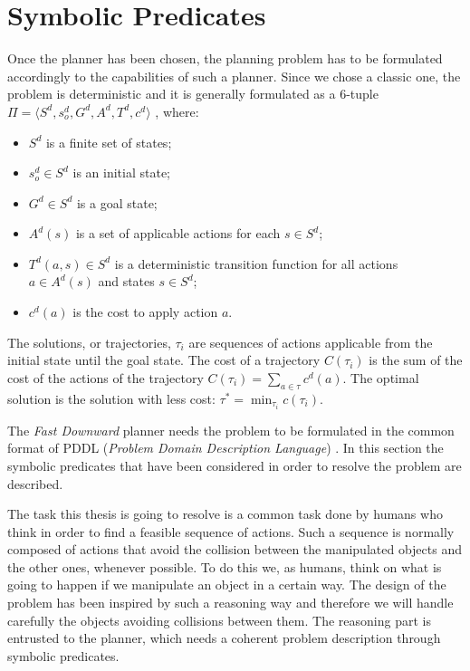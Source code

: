 \section{Symbolic Predicates}
Once the planner has been chosen, the planning problem has to be formulated accordingly to the capabilities of such a planner. Since we chose a classic one, the problem is deterministic and it is generally formulated as a $6$-tuple $\Pi=\langle S^d, s_o^d, G^d, A^d, T^d, c^d \rangle$ \cite{little2007probabilistic}, where:
\begin{itemize}
\item $S^d$ is a finite set of states;
\item $s_o^d \in S^d$ is an initial state;
\item $G^d \in S^d$ is a goal state;
\item $A^d(s)$ is a set of applicable actions for each $s \in S^d$;
\item $T^d(a,s) \in S^d$ is a deterministic transition function for all actions $a \in A^d(s)$ and states $ s \in S^d$;
\item $c^d(a)$ is the cost to apply action $a$. 
\end{itemize}
The solutions, or trajectories, $\tau_i$ are sequences of actions applicable from the initial state until the goal state. The cost of a trajectory $C(\tau_i)$ is the sum of the cost of the actions of the trajectory $C(\tau_i) = \sum_{a \in \tau} c^d(a)$. The optimal solution is the solution with less cost: $\tau^* = \min_{\tau_i} c(\tau_i)$.


The \textit{Fast Downward} planner needs the problem to be formulated in the common format of PDDL (\textit{Problem Domain Description Language}) \citep{pddl}. In this section the symbolic predicates that have been considered in order to resolve the problem are described.

The task this thesis is going to resolve is a common task done by humans who think in order to find a feasible sequence of actions. Such a sequence is normally composed of actions that avoid the collision between the manipulated objects and the other ones, whenever possible. To do this we, as humans, think on what is going to happen if we manipulate an object in a certain way. The design of the problem has been inspired by such a reasoning way and therefore we will handle carefully the objects avoiding collisions between them. The reasoning part is entrusted to the planner, which needs a coherent problem description through symbolic predicates. 


